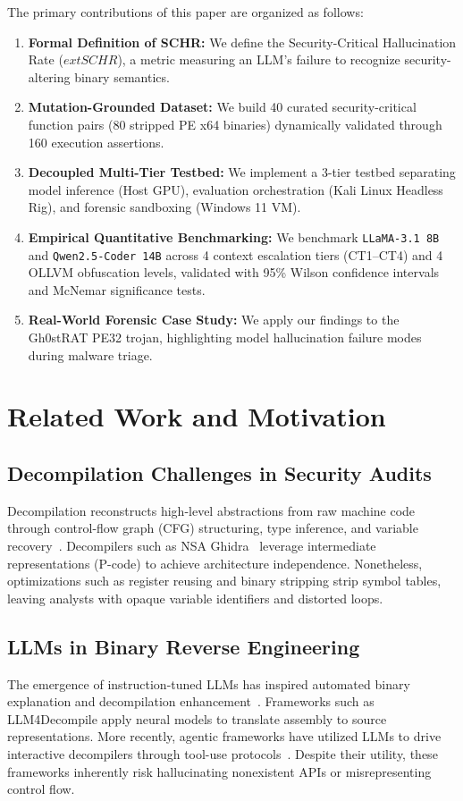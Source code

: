 \documentclass[runningheads]{llncs}
\begin{document}
The primary contributions of this paper are organized as follows:
\begin{enumerate}
    \item \textbf{Formal Definition of SCHR:} We define the Security-Critical Hallucination Rate ($	ext{SCHR}$), a metric measuring an LLM's failure to recognize security-altering binary semantics.
    \item \textbf{Mutation-Grounded Dataset:} We build 40 curated security-critical function pairs (80 stripped PE x64 binaries) dynamically validated through 160 execution assertions.
    \item \textbf{Decoupled Multi-Tier Testbed:} We implement a 3-tier testbed separating model inference (Host GPU), evaluation orchestration (Kali Linux Headless Rig), and forensic sandboxing (Windows 11 VM).
    \item \textbf{Empirical Quantitative Benchmarking:} We benchmark \texttt{LLaMA-3.1 8B} and \texttt{Qwen2.5-Coder 14B} across 4 context escalation tiers (CT1--CT4) and 4 OLLVM obfuscation levels, validated with 95\% Wilson confidence intervals and McNemar significance tests.
    \item \textbf{Real-World Forensic Case Study:} We apply our findings to the Gh0stRAT PE32 trojan, highlighting model hallucination failure modes during malware triage.
\end{enumerate}

\section{Related Work and Motivation}

\subsection{Decompilation Challenges in Security Audits}
Decompilation reconstructs high-level abstractions from raw machine code through control-flow graph (CFG) structuring, type inference, and variable recovery~\cite{schwarz2002disassembly,yakdan2015norepdb}. Decompilers such as NSA Ghidra~\cite{ghidra2024nsa} leverage intermediate representations (P-code) to achieve architecture independence. Nonetheless, optimizations such as register reusing and binary stripping strip symbol tables, leaving analysts with opaque variable identifiers and distorted loops.

\subsection{LLMs in Binary Reverse Engineering}
The emergence of instruction-tuned LLMs has inspired automated binary explanation and decompilation enhancement~\cite{katz2019towards,sun2024llm4decompile}. Frameworks such as LLM4Decompile apply neural models to translate assembly to source representations. More recently, agentic frameworks have utilized LLMs to drive interactive decompilers through tool-use protocols~\cite{qayyum2024context}. Despite their utility, these frameworks inherently risk hallucinating nonexistent APIs or misrepresenting control flow.
\end{document}
